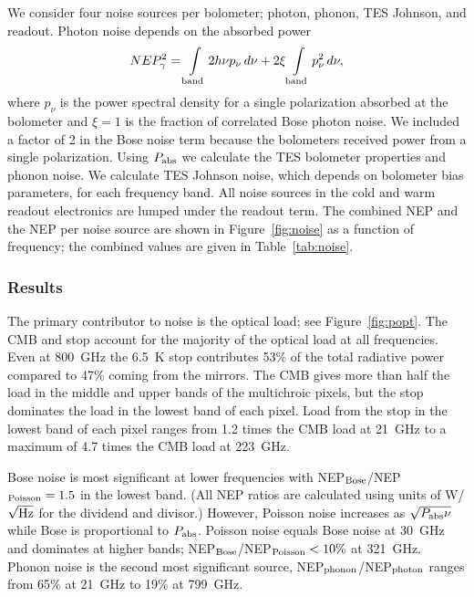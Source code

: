 \documentclass[]{spie}  %
\begin{document}
We consider four noise sources per bolometer; photon, phonon, TES Johnson, and readout. 
Photon noise depends on the absorbed power\cite{richards1994} 
\begin{equation}
\label{eq:photon}
NEP_{\gamma}^2 = \int\limits_{\rm band} 2h\nu p_{\nu} \, d\nu + 2\xi \int\limits_{\rm band} p_{\nu}^2 \,  d\nu,
\end{equation} 
where $p_{\nu}$ is the power spectral density for a single polarization absorbed at the bolometer and $\xi=1$ is the fraction of correlated Bose 
photon noise. We included a factor of 2 in the Bose noise term because the bolometers received power from a single 
polarization. 
Using $P_{\rm abs}$ we calculate the TES bolometer properties and phonon noise.\cite{mather1982}  
We calculate TES Johnson noise, which depends on bolometer bias parameters, for each frequency band.  
All noise sources in the cold and warm readout electronics are lumped under the readout term.  
The combined NEP and the NEP per noise source are shown in 
Figure~\ref{fig:noise} as a function of frequency; the combined values are given in Table~\ref{tab:noise}.

\subsubsection{Results}  

The primary contributor to noise is the optical load; see Figure~\ref{fig:popt}. 
The CMB and stop account for the majority of the optical load 
at all frequencies. Even at 800~GHz the 6.5~K stop
contributes 53\% of the total radiative power compared to 47\% coming from the mirrors.  
The CMB gives more than half the load 
in the middle and upper bands of the multichroic pixels, but the stop dominates the load in the lowest band of each pixel.  
Load from the stop in the lowest band of each pixel ranges from 1.2 times the CMB load at 21~GHz to a maximum of 4.7 
times the CMB load at 223~GHz. 

Bose noise is most significant 
at lower frequencies with NEP$_{\rm Bose}$/NEP$_{\rm Poisson}= 1.5 $ in the lowest band. (All NEP ratios are calculated using 
units of W/$\sqrt{\rm Hz}$ for the dividend and divisor.)  However, Poisson noise increases as 
$\sqrt{P_{\rm abs}\nu}$ while Bose is proportional to $P_{\rm abs}$. Poisson noise equals Bose noise at 30~GHz and 
dominates at higher bands; NEP$_{\rm Bose}$/NEP$_{\rm Poisson} <10\%$ at 321~GHz. 
Phonon noise is the second most significant source, NEP$_{\rm phonon}$/NEP$_{\rm photon}$ ranges from 65\% at 21~GHz 
to 19\% at 799~GHz. 
\end{document}
